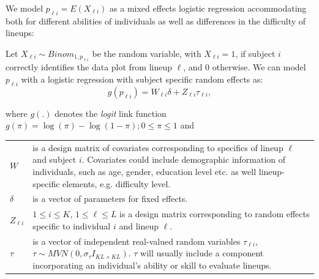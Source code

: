 \documentclass{article}
\newcommand{\red}[1]{{\color{red} #1}}
\newcommand{\hh}[1]{{\color{orange} #1}} %
\begin{document}
\hh{
We model $p_{\ell i} = E(X_{\ell i})$ as  a mixed effects logistic regression
 accommodating both for different abilities of individuals as well as differences in the difficulty of lineups: 


Let $X_{\ell i} \sim Binom_{1, p_{\ell i}}$ be the random variable, with $X_{ \ell i}= 1$, if  subject $i$ correctly identifies the data plot from lineup $\ell$, and 0 otherwise.
We can model $p_{ \ell i}$ with a logistic regression with subject specific random effects as:
\begin{equation} \label{mixed}
g( p_{\ell i} )= W_{\ell i} \delta +  Z_{\ell i}  \tau_{\ell i},  
\end{equation}

where $g(.)$ denotes the {\it logit} link function $g(\pi)=\log(\pi) - \log(1-\pi); 0 \le \pi \le 1$ and

\begin{tabular}{lp{5.5in}}
$W$  & is a design matrix of covariates corresponding to specifics of lineup $\ell$ and subject $i$. Covariates could include  demographic information of individuals, such as age, gender, education level etc. as well lineup-specific elements, e.g. difficulty level. \\
$\delta$ & is a vector of parameters for fixed effects.\\
$Z_{\ell i}$ & $1 \le i \le K$, $1 \le \ell \le L$  is a design matrix corresponding to random effects specific to individual $i$ and lineup $\ell$.  \\
$\tau$ & is a vector of independent real-valued random variables $\tau_{\ell i}$,  $\tau  \sim  MVN(0,\sigma_\tau I_{KL \times KL})$. $\tau$ will usually include a component incorporating an individual's ability or skill to evaluate lineups.\\
\end{tabular}

}



\end{document}
